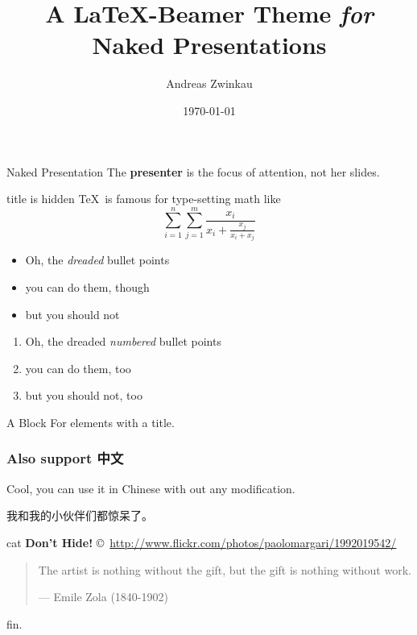 \documentclass[english,german]{beamer}
\title{A \LaTeX-Beamer Theme {\itshape for} Naked Presentations}
\date{\today}
\author{Andreas Zwinkau}
\begin{document}
\titlepage

\begin{defnframe}{Naked Presentation}
The \textbf{presenter} is the focus of attention,
not her slides.
\end{defnframe}

\begin{frame}{title is hidden}
\TeX\ is famous for type-setting math like \[
   \sum_{i=1}^{n}\sum_{j=1}^{m} 
   \frac{x_i}{x_i + \frac{x_j}{x_i+x_j}}
\]
\end{frame}

\begin{frame}
\begin{itemize}
   \item Oh, the {\itshape dreaded} bullet points
   \item you can do them, though
   \item but you should not
\end{itemize}
\end{frame}

\begin{frame}
\begin{enumerate}
   \item Oh, the dreaded \emph{numbered} bullet points
   \item you can do them, too
   \item but you should not, too
\end{enumerate}
\end{frame}

\begin{frame}
\begin{block}{A Block}
   For elements with a title.
\end{block}
\end{frame}
\begin{frame}
   \frametitle{Also support 中文}
   Cool, you can use it in Chinese with out any modification.\par
   我和我的小伙伴们都惊呆了。
\end{frame}

\begin{imageframe}{cat}
   \color{black}
   {\bf\Large Don't Hide!}
   \vskip6.5cm
   \hfill {\tiny\copyright~\url{http://www.flickr.com/photos/paolomargari/1992019542/}}
\end{imageframe}

\begin{frame}
\begin{quote}
   The artist is nothing without the gift, but the gift is nothing without work.

   \hfill--- Emile Zola (1840-1902)
\end{quote}
\end{frame}

\emptyslide

\begin{wordframe}
fin.
\end{wordframe}
\end{document}
